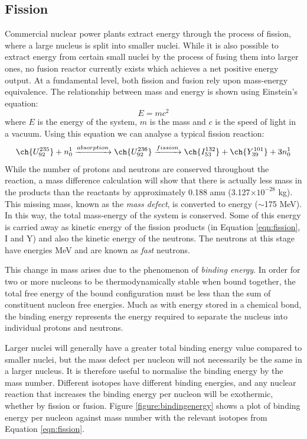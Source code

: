 \subsection{Fission}

Commercial nuclear power plants extract energy through the process of fission, where a large nucleus is split into smaller nuclei. While it is also possible to extract energy from certain small nuclei by the process of fusing them into larger ones, no fusion reactor currently exists which achieves a net positive energy output. At a fundamental level, both fission and fusion rely upon mass-energy equivalence. The relationship between mass and energy is shown using Einstein's equation:
\begin{equation}
\label{emc2}
    E = mc^{2}
\end{equation}
where $E$ is the energy of the system, $m$ is the mass and $c$ is the speed of light in a vacuum. Using this equation we can analyse a typical fission reaction:
\begin{equation}
    \ch{U^{235}_{92}} + n^{1}_{0} \xrightarrow[]{absorption} \ch{U^{236}_{92}} \xrightarrow[]{fission} \ch{I^{132}_{53}} + \ch{Y^{101}_{39}} + 3n^{1}_{0}
\label{eqn:fission} 
\end{equation}
While the number of protons and neutrons are conserved throughout the reaction, a mass difference calculation will show that there is actually less mass in the products than the reactants by approximately 0.188 amu (3.127$\times 10^{-28}$ kg). This missing mass, known as the \emph{mass defect}, is converted to energy ($\sim$175 MeV). In this way, the total mass-energy of the system is conserved. Some of this energy is carried away as kinetic energy of the fission products (in Equation \ref{eqn:fission}, I and Y) and also the kinetic energy of the neutrons. The neutrons at this stage have energies  MeV and are known as \emph{fast} neutrons.

This change in mass arises due to the phenomenon of \emph{binding energy}. In order for two or more nucleons to be thermodynamically stable when bound together, the total free energy of the bound configuration must be less than the sum of constituent nucleon free energies. Much as with energy stored in a chemical bond, the binding energy represents the energy required to separate the nucleus into individual protons and neutrons. 

Larger nuclei will generally have a greater total binding energy value compared to smaller nuclei, but the mass defect per nucleon will not necessarily be the same in a larger nucleus. It is therefore useful to normalise the binding energy by the mass number. Different isotopes have different binding energies, and any nuclear reaction that increases the binding energy per nucleon will be exothermic, whether by fission or fusion. Figure \ref{figure:bindingenergy} shows a plot of binding energy per nucleon against mass number with the relevant isotopes from Equation \ref{eqn:fission}. 

